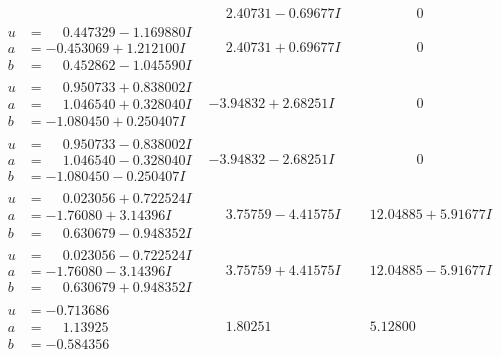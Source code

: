 \documentclass[1p]{elsarticle_modified}
\theoremstyle{definition}
\begin{document}
$$\begin{array}{c|c|c}
 & \phantom{-}2.40731 - 0.69677 I & \phantom{-0.000000 } 0 \\ \hline\begin{aligned}
u &= \phantom{-}0.447329 - 1.169880 I \\
a &= -0.453069 + 1.212100 I \\
b &= \phantom{-}0.452862 - 1.045590 I\end{aligned}
 & \phantom{-}2.40731 + 0.69677 I & \phantom{-0.000000 } 0 \\ \hline\begin{aligned}
u &= \phantom{-}0.950733 + 0.838002 I \\
a &= \phantom{-}1.046540 + 0.328040 I \\
b &= -1.080450 + 0.250407 I\end{aligned}
 & -3.94832 + 2.68251 I & \phantom{-0.000000 } 0 \\ \hline\begin{aligned}
u &= \phantom{-}0.950733 - 0.838002 I \\
a &= \phantom{-}1.046540 - 0.328040 I \\
b &= -1.080450 - 0.250407 I\end{aligned}
 & -3.94832 - 2.68251 I & \phantom{-0.000000 } 0 \\ \hline\begin{aligned}
u &= \phantom{-}0.023056 + 0.722524 I \\
a &= -1.76080 + 3.14396 I \\
b &= \phantom{-}0.630679 - 0.948352 I\end{aligned}
 & \phantom{-}3.75759 - 4.41575 I & \phantom{-}12.04885 + 5.91677 I \\ \hline\begin{aligned}
u &= \phantom{-}0.023056 - 0.722524 I \\
a &= -1.76080 - 3.14396 I \\
b &= \phantom{-}0.630679 + 0.948352 I\end{aligned}
 & \phantom{-}3.75759 + 4.41575 I & \phantom{-}12.04885 - 5.91677 I \\ \hline\begin{aligned}
u &= -0.713686\phantom{ +0.000000I} \\
a &= \phantom{-}1.13925\phantom{ +0.000000I} \\
b &= -0.584356\phantom{ +0.000000I}\end{aligned}
 & \phantom{-}1.80251\phantom{ +0.000000I} & \phantom{-}5.12800\phantom{ +0.000000I} \\ \hline\begin{aligned}

\end{aligned}
\end{array}$$
\end{document}

